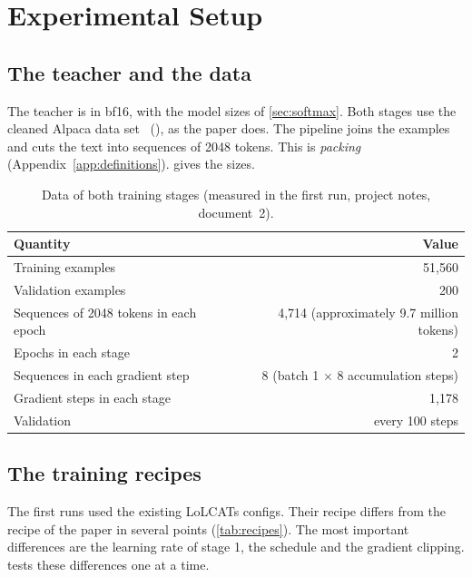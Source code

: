 \chapter{Experimental Setup}
\label{ch:setup}

\section{The teacher and the data}
\label{sec:data}

The teacher is  in bf16, with the model sizes of \cref{sec:softmax}. Both stages use the cleaned Alpaca data set~\cite{alpaca} (), as the paper does. The pipeline joins the examples and cuts the text into sequences of 2048 tokens. This is \emph{packing} (Appendix~\ref{app:definitions}).  gives the sizes.

\begin{table}[ht]
\centering
\small
\caption[Data of both training stages]{Data of both training stages (measured in the first run, project notes, document~2).}
\label{tab:data}
\begin{tabular}{@{}lr@{}}
\toprule
Quantity & Value \\
\midrule
Training examples & 51,560 \\
Validation examples & 200 \\
Sequences of 2048 tokens in each epoch & 4,714 (approximately 9.7 million tokens) \\
Epochs in each stage & 2 \\
Sequences in each gradient step & 8 (batch 1 $\times$ 8 accumulation steps) \\
Gradient steps in each stage & 1,178 \\
Validation & every 100 steps \\
\bottomrule
\end{tabular}
\end{table}

\section{The training recipes}
\label{sec:recipes}

The first runs used the existing LoLCATs configs. Their recipe differs from the recipe of the paper in several points (\cref{tab:recipes}). The most important differences are the learning rate of stage 1, the schedule and the gradient clipping.  tests these differences one at a time.

